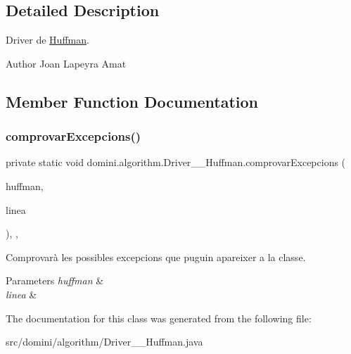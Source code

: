 \subsection{Detailed Description}
Driver de \hyperlink{classdomini_1_1algorithm_1_1Huffman}{Huffman}. 

\begin{DoxyAuthor}{Author}
Joan Lapeyra Amat 
\end{DoxyAuthor}


\subsection{Member Function Documentation}
\mbox{\label{classdomini_1_1algorithm_1_1Driver____Huffman_a5d56f18f1d8f96dfc735b9a127094319}} 
\subsubsection{\texorpdfstring{comprovar\+Excepcions()}{comprovarExcepcions()}}
{\footnotesize\ttfamily private static void domini.\+algorithm.\+Driver\+\_\+\+\_\+\+Huffman.\+comprovar\+Excepcions (\begin{DoxyParamCaption}\item[{\hyperlink{classdomini_1_1algorithm_1_1Huffman}{Huffman}}]{huffman,  }\item[{String}]{linea }\end{DoxyParamCaption})\hspace{0.3cm}{\ttfamily [inline]}, {\ttfamily [static]}, {\ttfamily [private]}}



Comprovarà les possibles excepcions que puguin apareixer a la classe. 


\begin{DoxyParams}{Parameters}
{\em huffman} & \\
\hline
{\em linea} & \\
\hline
\end{DoxyParams}


The documentation for this class was generated from the following file\+:\begin{DoxyCompactItemize}
\item 
src/domini/algorithm/Driver\+\_\+\+\_\+\+Huffman.\+java\end{DoxyCompactItemize}

